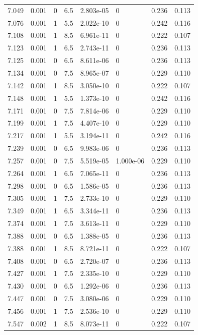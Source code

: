 \documentclass[preview]{standalone}
\begin{document}
{{{{{{\begin{tabular}{L{1.2cm}C{1.2cm} C{0.3cm}C{0.5cm} C{1.4cm}C{1.4cm} C{1.4cm}C{1.4cm}}
  7.049  &  0.001  & 0     & 6.5 &  2.803e-05  & 0  & 0.236 &  0.113   \\ 
  7.076  &  0.001  & 1     & 5.5 &  2.022e-10  & 0  & 0.242 &  0.116   \\ 
  7.108  &  0.001  & 1     & 8.5 &  6.961e-11  & 0  & 0.222 &  0.107   \\ 
  7.123  &  0.001  & 1     & 6.5 &  2.743e-11  & 0  & 0.236 &  0.113   \\ 
  7.125  &  0.001  & 0     & 6.5 &  8.611e-06  & 0  & 0.236 &  0.113   \\ 
  7.134  &  0.001  & 0     & 7.5 &  8.965e-07  & 0  & 0.229 &  0.110   \\ 
  7.142  &  0.001  & 1     & 8.5 &  3.050e-10  & 0  & 0.222 &  0.107   \\ 
  7.148  &  0.001  & 1     & 5.5 &  1.373e-10  & 0  & 0.242 &  0.116   \\ 
  7.171  &  0.001  & 0     & 7.5 &  7.814e-06  & 0  & 0.229 &  0.110   \\ 
  7.199  &  0.001  & 1     & 7.5 &  4.407e-10  & 0  & 0.229 &  0.110   \\ 
  7.217  &  0.001  & 1     & 5.5 &  3.194e-11  & 0  & 0.242 &  0.116   \\ 
  7.239  &  0.001  & 0     & 6.5 &  9.983e-06  & 0  & 0.236 &  0.113   \\ 
  7.257  &  0.001  & 0     & 7.5 &  5.519e-05  & 1.000e-06  & 0.229 &  0.110   \\ 
  7.264  &  0.001  & 1     & 6.5 &  7.065e-11  & 0  & 0.236 &  0.113   \\ 
  7.298  &  0.001  & 0     & 6.5 &  1.586e-05  & 0  & 0.236 &  0.113   \\ 
  7.305  &  0.001  & 1     & 7.5 &  2.733e-10  & 0  & 0.229 &  0.110   \\ 
  7.349  &  0.001  & 1     & 6.5 &  3.344e-11  & 0  & 0.236 &  0.113   \\ 
  7.374  &  0.001  & 1     & 7.5 &  3.613e-11  & 0  & 0.229 &  0.110   \\ 
  7.388  &  0.001  & 0     & 6.5 &  1.388e-05  & 0  & 0.236 &  0.113   \\ 
  7.388  &  0.001  & 1     & 8.5 &  8.721e-11  & 0  & 0.222 &  0.107   \\ 
  7.408  &  0.001  & 0     & 6.5 &  2.720e-07  & 0  & 0.236 &  0.113   \\ 
  7.427  &  0.001  & 1     & 7.5 &  2.335e-10  & 0  & 0.229 &  0.110   \\ 
  7.430  &  0.001  & 0     & 6.5 &  1.292e-06  & 0  & 0.236 &  0.113   \\ 
  7.447  &  0.001  & 0     & 7.5 &  3.080e-06  & 0  & 0.229 &  0.110   \\ 
  7.456  &  0.001  & 1     & 7.5 &  2.536e-10  & 0  & 0.229 &  0.110   \\ 
  7.547  &  0.002  & 1     & 8.5 &  8.073e-11  & 0  & 0.222 &  0.107   \\ 
\hline 
\end{tabular} 

}}}}}}
\end{document}
